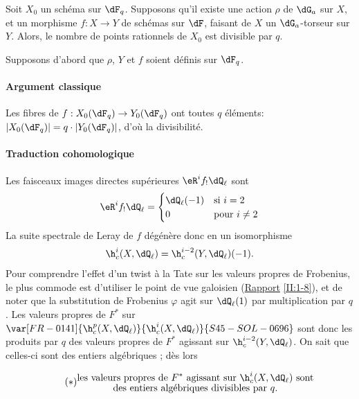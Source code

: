 \begin{theorem_}[Kazhdan]\label{VI:1-13}
Soit $X_0$ un schéma sur $\dF_q$. Supposons qu'il existe une action $\rho$ de 
$\dG_a$ sur $X$, et un morphisme $f:X\to Y$ de schémas sur $\dF$, faisant de 
$X$ un $\dG_a$-torseur sur $Y$. Alors, le nombre de points rationnels de $X_0$ 
est divisible par $q$.
\end{theorem_}

Supposons d'abord que $\rho$, $Y$ et $f$ soient définis sur $\dF_q$. 


\paragraph{Argument classique}
Les fibres de $f:X_0(\dF_q)\to Y_0(\dF_q)$ ont toutes $q$ éléments: 
$|X_0(\dF_q)| = q\cdot |Y_0(\dF_q)|$, d'où la divisibilité. 


\paragraph{Traduction cohomologique}
Les faisceaux images directes supérieures $\eR^i f_!\dQ_\ell$ sont 
\[
  \eR^i f_!\dQ_\ell = \begin{cases}
                       \dQ_\ell(-1) & \text{si $i = 2$} \\
                       0            & \text{pour $i\ne 2$}
                     \end{cases}
\]
La suite spectrale de Leray de $f$ dégénère donc en un isomorphisme 
\[
  \h_c^i(X,\dQ_\ell) = \h_c^{i-2}(Y,\dQ_\ell)(-1) \text{.}
\]
Pour comprendre l'effet d'un twist à la Tate sur les valeurs propres de 
Frobenius, le plus commode est d'utiliser le point de vue galoisien 
(\hyperref[II]{Rapport} \ref{II:1-8}), et de noter que la substitution de 
Frobenius $\varphi$ agit sur $\dQ_\ell(1)$ par multiplication par $q$. Les 
valeurs propres de $F^\ast$ sur $\var[FR-0141]{\h_c^p(X,\dQ_\ell)}{\h_c^i(X,\dQ_\ell)}{S45-SOL-0696}$ sont donc les produits par 
$q$ des valeurs propres de $F^\ast$ agissant sur $\h_c^{i-2}(Y,\dQ_\ell)$. On 
sait que celles-ci sont des entiers algébriques ; dès 
lors 

\begin{equation*}\tag{$*$}\label{VI:eq:*}
  \substack{\displaystyle\text{les valeurs propres de $F^\ast$ agissant sur $\h_c^i(X,\dQ_\ell)$ sont} \\
  \displaystyle\text{des entiers algébriques divisibles par $q$.}}
\end{equation*}


